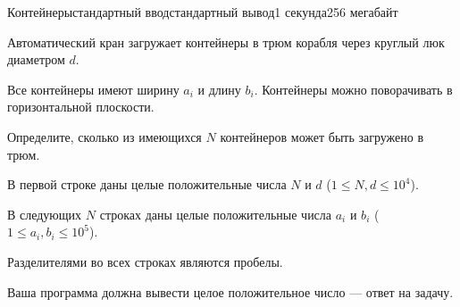 \begin{problem}{Контейнеры}{стандартный ввод}{стандартный вывод}{1 секунда}{256 мегабайт}

Автоматический кран загружает контейнеры в трюм корабля через круглый люк диаметром $d$.

Все контейнеры имеют ширину $a_i$ и длину $b_i$. Контейнеры можно поворачивать в горизонтальной плоскости.

Определите, сколько из имеющихся $N$ контейнеров может быть загружено в трюм.

\InputFile
В первой строке даны целые положительные числа $N$ и $d$ ($1 \leq N, d \leq 10^4$).

В следующих $N$ строках даны целые положительные числа $a_i$ и $b_i$ ($1 \leq a_i, b_i \leq 10^5$).

Разделителями во всех строках являются пробелы.

\OutputFile
Ваша программа должна вывести целое положительное число --- ответ на задачу.

\Example

\begin{example}
%
\end{example}

\end{problem}

